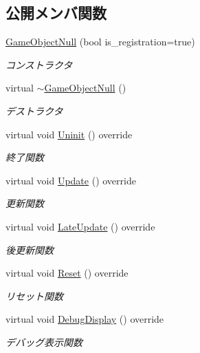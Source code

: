 \subsection*{公開メンバ関数}
\begin{DoxyCompactItemize}
\item 
\mbox{\hyperlink{class_game_object_null_a63df1fd88b786686088b2ac9f79761d1}{Game\+Object\+Null}} (bool is\+\_\+registration=true)
\begin{DoxyCompactList}\small\item\em コンストラクタ \end{DoxyCompactList}\item 
virtual \mbox{\hyperlink{class_game_object_null_a3aee36c6a66b723f927c017ec3916918}{$\sim$\+Game\+Object\+Null}} ()
\begin{DoxyCompactList}\small\item\em デストラクタ \end{DoxyCompactList}\item 
virtual void \mbox{\hyperlink{class_game_object_null_a1a70fbd3260fd1c0100320756830a0db}{Uninit}} () override
\begin{DoxyCompactList}\small\item\em 終了関数 \end{DoxyCompactList}\item 
virtual void \mbox{\hyperlink{class_game_object_null_aeeb51b7e7aa41fd0b16f8f7c016bdb55}{Update}} () override
\begin{DoxyCompactList}\small\item\em 更新関数 \end{DoxyCompactList}\item 
virtual void \mbox{\hyperlink{class_game_object_null_abc4e2c2ce54fb3d0bc3f0b45149a66cb}{Late\+Update}} () override
\begin{DoxyCompactList}\small\item\em 後更新関数 \end{DoxyCompactList}\item 
virtual void \mbox{\hyperlink{class_game_object_null_a26a748e17ea31b987249022562f5198c}{Reset}} () override
\begin{DoxyCompactList}\small\item\em リセット関数 \end{DoxyCompactList}\item 
virtual void \mbox{\hyperlink{class_game_object_null_a9bc551307ae5aa0ad8e754f976ffd1c7}{Debug\+Display}} () override
\begin{DoxyCompactList}\small\item\em デバッグ表示関数 \end{DoxyCompactList}\end{DoxyCompactItemize}
